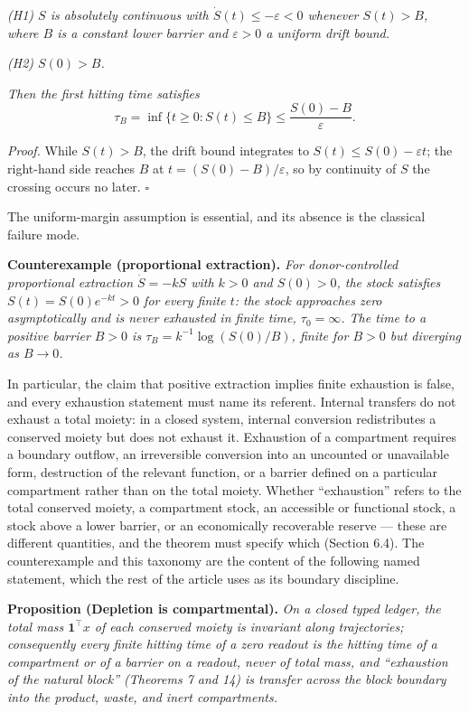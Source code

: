 \documentclass[11pt]{article}
\begin{document}
\emph{(H1) \(S\) is absolutely continuous with
\(\dot S(t) \le -\varepsilon < 0\) whenever \(S(t) > B\), where \(B\) is
a constant lower barrier and \(\varepsilon > 0\) a uniform drift bound.}

\emph{(H2) \(S(0) > B\).}

\emph{Then the first hitting time satisfies}
\[\tau_B = \inf\{ t \ge 0 : S(t) \le B \} \le \frac{S(0) - B}{\varepsilon}.\]

\emph{Proof.} While \(S(t) > B\), the drift bound integrates to
\(S(t) \le S(0) - \varepsilon t\); the right-hand side reaches \(B\) at
\(t = (S(0) - B)/\varepsilon\), so by continuity of \(S\) the crossing
occurs no later. \ensuremath{\square}

The uniform-margin assumption is essential, and its absence is the
classical failure mode.

\textbf{Counterexample (proportional extraction).} \emph{For
donor-controlled proportional extraction \(\dot S = -kS\) with \(k > 0\)
and \(S(0) > 0\), the stock satisfies \(S(t) = S(0)e^{-kt} > 0\) for
every finite \(t\): the stock approaches zero asymptotically and is
never exhausted in finite time, \(\tau_0 = \infty\). The time to a
positive barrier \(B > 0\) is \(\tau_B = k^{-1}\log(S(0)/B)\), finite
for \(B > 0\) but diverging as \(B \to 0\).}

In particular, the claim that positive extraction implies finite
exhaustion is false, and every exhaustion statement must name its
referent. Internal transfers do not exhaust a total moiety: in a closed
system, internal conversion redistributes a conserved moiety but does
not exhaust it. Exhaustion of a compartment requires a boundary outflow,
an irreversible conversion into an uncounted or unavailable form,
destruction of the relevant function, or a barrier defined on a
particular compartment rather than on the total moiety. Whether
``exhaustion'' refers to the total conserved moiety, a compartment
stock, an accessible or functional stock, a stock above a lower barrier,
or an economically recoverable reserve --- these are different
quantities, and the theorem must specify which (Section 6.4). The
counterexample and this taxonomy are the content of the following named
statement, which the rest of the article uses as its boundary
discipline.

\textbf{Proposition (Depletion is compartmental).} \emph{On a closed
typed ledger, the total mass \(\mathbf{1}^\top x\) of each conserved
moiety is invariant along trajectories; consequently every finite
hitting time of a zero readout is the hitting time of a compartment or
of a barrier on a readout, never of total mass, and ``exhaustion of the
natural block'' (Theorems 7 and 14) is transfer across the block
boundary into the product, waste, and inert compartments.}
\end{document}
